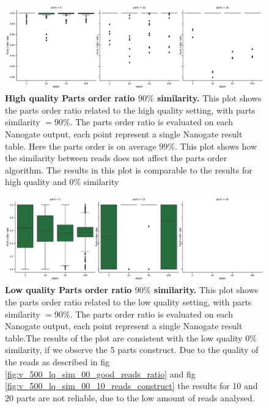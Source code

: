 \documentclass[11pt, a4paper]{article}
\begin{document}
\begin{figure}[ht]
    \begin{center}
    \includegraphics[width=1.35\textwidth]{../results/images_notebook/v_500/hq_sim_90_parts_order_ratio.pdf}
    \end{center}
    \caption{{\bf High quality Parts order ratio $90\%$ similarity.} This plot shows the parts order ratio related to the high quality setting, with parts similarity $=90\%$. The parts order ratio is evaluated on each  Nanogate output, each point represent a single Nanogate result table. Here the parts order is on average $99\%$. This plot shows how the similarity between reads does not affect the parts order algorithm. The results in this plot is comparable to the results for high quality and $0\%$ similarity}
   \label{fig:v_500_hq_sim_90_parts_order_ratio}
\end{figure}


\begin{figure}[ht]
    \begin{center}
    \includegraphics[width=1.35\textwidth]{../results/images_notebook/v_500/lq_sim_90_parts_order_ratio.pdf}
    \end{center}
    \caption{{\bf Low quality Parts order ratio $90\%$ similarity.} This plot shows the parts order ratio related to the low quality setting, with parts similarity $=90\%$. The parts order ratio is evaluated on each  Nanogate output, each point represent a single Nanogate result table.The results of the plot are consistent with the low quality $0\%$ similarity, if we observe the 5 parts construct. Due to the quality of the reads as described in fig \ref{fig:v_500_lq_sim_00_good_reads_ratio} and fig \ref{fig:v_500_lq_sim_00_10_reads_construct} the results for 10 and 20 parts are not reliable, due to the low amount of reads analysed.}
   \label{fig:v_500_lq_sim_90_parts_order_ratio}
\end{figure}
\end{document}
